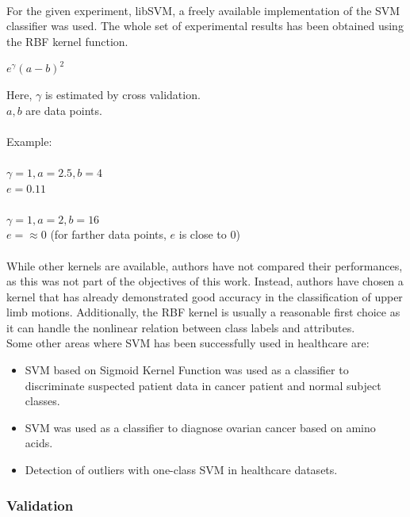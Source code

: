 \documentclass[12pt]{article}
\begin{document}
\paragraph{}
For the given experiment, libSVM\cite{libSVM}, a freely available implementation of the SVM
classifier was used. The whole set of experimental results has been obtained using the RBF kernel function.

\begin{center}
	$e^{\gamma}(a-b)^2$\\
\end{center}
Here, $\gamma$ is estimated by cross validation.\\
$a,b$ are data points.\\\\
Example:\\\\
$\gamma = 1, a = 2.5, b= 4$\\
$e = 0.11$\\\\
$\gamma = 1, a = 2, b = 16$\\
$e = \approx 0$ (for farther data points, $e$ is close to $0$)

\paragraph{}
While other kernels are available, authors have not compared their performances, as this was not part of the objectives of this work. Instead, authors have chosen a kernel that has already demonstrated good accuracy in the classification of upper limb motions. Additionally, the RBF kernel is usually a reasonable first choice as it can handle the nonlinear relation between class labels and attributes.\\

Some other areas where SVM has been successfully used in healthcare are:
\begin{itemize}
	\item SVM based on Sigmoid Kernel Function was used as a classifier to discriminate suspected patient data in cancer patient and normal subject classes. \cite{Liang Kou}
	\item SVM was used as a classifier to diagnose ovarian cancer based on amino acids. \cite{Farid A. Badria}
	\item Detection of outliers with one-class SVM in healthcare datasets.\cite{Roy Thomas}
\end{itemize}


\subsubsection{Validation}
\end{document}
